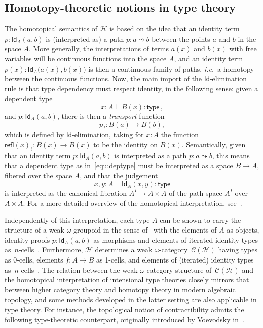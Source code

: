 \documentclass[11pt]{article}
\newcommand{\type}{\mathsf{type}}
\newcommand{\Id}{\mathsf{Id}}
\newcommand{\id}[1]{\Id_{#1}}
\newcommand{\refl}{\mathsf{refl}}
\newcommand{\Hint}{\mathcal{H}}
\theoremstyle{definition}
\begin{document}
\subsection{Homotopy-theoretic notions in type theory} 

\noindent The homotopical semantics of  $\Hint$ is based on the idea that an identity term~$p:  \id{A}(a,b)$ 
is (interpreted as) a path $p: a\leadsto b$ between the points $a$ and $b$ in the space $A$.   
More generally, the interpretations of terms $a(x)$ and $b(x)$ with free variables will be continuous 
functions into the 
space $A$, and an identity term $p(x) :  \id{A}\big(a(x),b(x)\big)$ is then a 
continuous family of paths, \emph{i.e.}~a homotopy between the continuous functions. Now, the main import of the 
$\Id$-elimination rule is that  type dependency must respect identity, in the following sense: given a dependent type
\begin{equation}
\label{equ:deptype}
x:A \vdash B(x) : \type \, ,
\end{equation} 
and $p: \id{A}(a,b)$, there is then a \emph{transport} function 
 $$p_{\, ! } : B(a) \rightarrow B(b),$$ which is defined by $\Id$-elimination, taking for $x : A$
the function $\refl(x)_{\, !} : B(x) \rightarrow B(x)$ to be the identity on $B(x)$.  Semantically, 
given that an identity term $p: \id{A}(a,b)$ is interpreted as a path $p: a\leadsto b$, 
 this means that a dependent type as in~\eqref{equ:deptype} must be interpreted as a space $B\rightarrow A$, fibered
 over the space $A$,  and that the judgement
  \[
  x,y:A \vdash\id{A}(x,y) : \type
  \] 
  is interpreted as the canonical fibration $A^I \rightarrow A\times A$ 
 of the path space $A^I$ over $A \times A$. For a more detailed overview of the homotopical interpretation, 
 see~\cite{AwodeyS:typth}.

Independently of this interpretation, each type $A$ can be shown to carry the structure of a weak 
$\omega$-groupoid in the sense of~\cite{BataninM:mongcn,LeinsterT:higohc} with the elements of $A$ as objects, identity proofs $p : \id{A}(a,b)$ as morphisms and 
 elements of iterated identity types 
 as~$n$-cells~\cite{vandenBergB:typwg,LumsdaineP:weaci}. Furthermore, $\Hint$ 
 determines a weak $\omega$-category~$\mathcal{C}(\Hint)$ having types as 0-cells, elements $f : A \rightarrow B$ as 1-cells, and elements of (iterated) identity types 
as~$n$-cells~\cite{Lumsdaine:higcft}.   The relation between the weak $\omega$-category structure of~$\mathcal{C}(\Hint)$ and the homotopical interpretation of intensional type theories closely mirrors that between higher category theory and homotopy theory in modern algebraic topology, and some methods developed in the latter setting are also applicable in type theory.  For instance,
 the topological notion of contractibility admits the following type-theoretic counterpart, originally
 introduced by Voevodsky in~\cite{VoevodskyV:unifc}.
\end{document}
